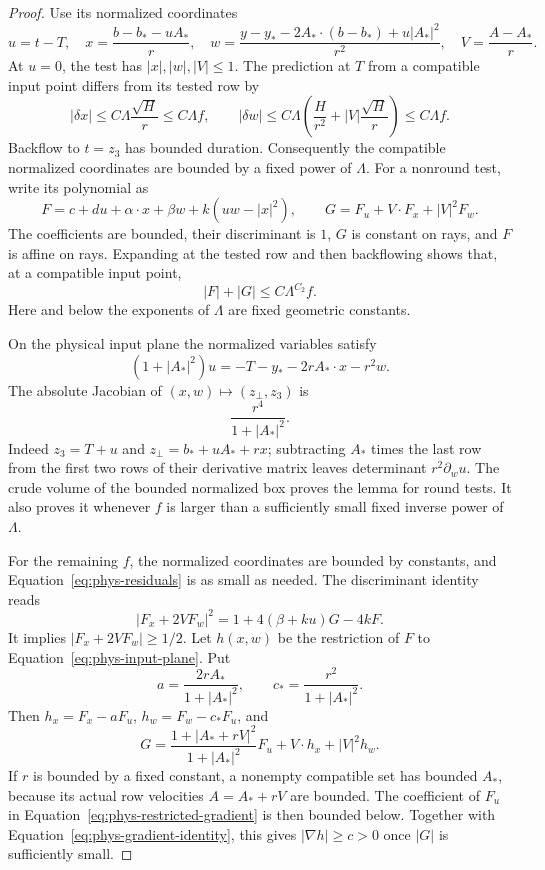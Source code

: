 \begin{proof}
Use its normalized coordinates
\[
 u=t-T,\quad x=\frac{b-b_*-uA_*}{r},\quad
 w=\frac{y-y_*-2A_*\cdot(b-b_*)+u|A_*|^2}{r^2},\quad
 V=\frac{A-A_*}{r}.
\]
At $u=0$, the test has $|x|,|w|,|V|\le1$.  The prediction at $T$
from a compatible input point differs from its tested row by
\[
 |\delta x|\le C\Lambda\frac{\sqrt H}{r}\le C\Lambda f,
 \qquad
 |\delta w|\le C\Lambda\left(\frac H{r^2}
                      +|V|\frac{\sqrt H}{r}\right)
                  \le C\Lambda f.
\]
Backflow to $t=z_3$ has bounded duration.  Consequently the
compatible normalized coordinates are bounded by a fixed power of
$\Lambda$.  For a nonround test, write its polynomial as
\[
 F=c+du+\alpha\cdot x+\beta w+k(uw-|x|^2),\qquad
 G=F_u+V\cdot F_x+|V|^2F_w.
\]
The coefficients are bounded, their discriminant is $1$, $G$ is
constant on rays, and $F$ is affine on rays.  Expanding at the
tested row and then backflowing shows that, at a compatible input
point,
\begin{equation}
 |F|+|G|\le C\Lambda^{C_2}f.
 \label{eq:phys-residuals}
\end{equation}
Here and below the exponents of $\Lambda$ are fixed geometric
constants.

On the physical input plane the normalized variables satisfy
\begin{equation}
 (1+|A_*|^2)u=-T-y_*-2rA_*\cdot x-r^2w.
 \label{eq:phys-input-plane}
\end{equation}
The absolute Jacobian of $(x,w)\mapsto(z_\perp,z_3)$ is
\begin{equation}
 \frac{r^4}{1+|A_*|^2}.
 \label{eq:phys-slice-jacobian}
\end{equation}
Indeed $z_3=T+u$ and $z_\perp=b_*+uA_*+rx$; subtracting $A_*$
times the last row from the first two rows of their derivative
matrix leaves determinant $r^2\partial_wu$.
The crude volume of the bounded normalized box proves the lemma
for round tests.  It also proves it whenever $f$ is larger than a
sufficiently small fixed inverse power of $\Lambda$.

For the remaining $f$, the normalized coordinates are bounded by
constants, and Equation~\eqref{eq:phys-residuals} is as small as
needed.  The discriminant identity reads
\begin{equation}
 |F_x+2VF_w|^2=1+4(\beta+ku)G-4kF.
 \label{eq:phys-gradient-identity}
\end{equation}
It implies $|F_x+2VF_w|\ge1/2$.  Let $h(x,w)$ be the restriction
of $F$ to Equation~\eqref{eq:phys-input-plane}.  Put
\[
 a=\frac{2rA_*}{1+|A_*|^2},\qquad
 c_* =\frac{r^2}{1+|A_*|^2}.
\]
Then $h_x=F_x-aF_u$, $h_w=F_w-c_*F_u$, and
\begin{equation}
 G=\frac{1+|A_*+rV|^2}{1+|A_*|^2}F_u
               +V\cdot h_x+|V|^2h_w.
 \label{eq:phys-restricted-gradient}
\end{equation}
If $r$ is bounded by a fixed constant, a nonempty compatible set has bounded
$A_*$, because its actual row velocities $A=A_*+rV$ are bounded.
The coefficient of $F_u$ in
Equation~\eqref{eq:phys-restricted-gradient} is then bounded below.
Together with Equation~\eqref{eq:phys-gradient-identity}, this gives
$|\nabla h|\ge c>0$ once $|G|$ is sufficiently small.


\end{proof}
